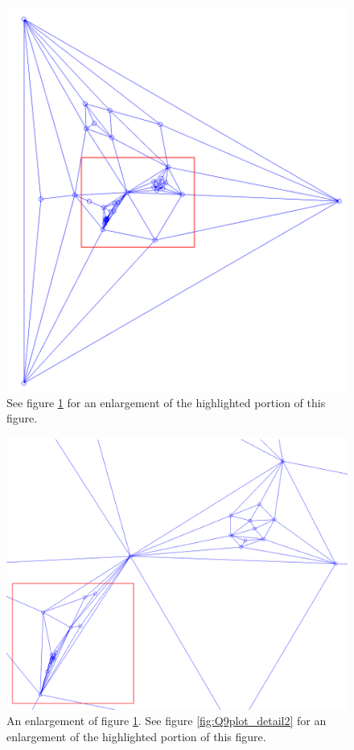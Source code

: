 \documentclass[a4paper]{article}
\begin{document}
\begin{figure}[H]
    \centering
    \includegraphics[width=0.6\columnwidth]{Q9zoom_in0_crop.png}
    \caption{See figure \ref{fig:Q9plot_detail0} for an enlargement of the highlighted portion of this figure.}
    \label{fig:Q9plot_detail0}
\end{figure}
\begin{figure}[H]
    \centering
    \includegraphics[width=0.9\columnwidth]{Q9zoom_in1_crop.png}
    \caption{An enlargement of figure \ref{fig:Q9plot_detail0}. See figure \ref{fig:Q9plot_detail2} for an enlargement of the highlighted portion of this figure.}
    \label{fig:Q9plot_detail1}
\end{figure}
\end{document}
